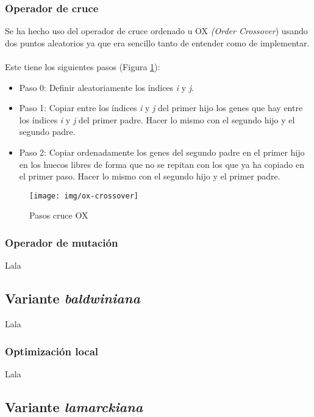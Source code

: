 \label{sec:op-cruce}
\subsubsection{Operador de cruce}

Se ha hecho uso del operador de cruce ordenado u OX \textit{(Order Crossover}) usando dos puntos aleatorios ya que era sencillo tanto de entender como de implementar.
\\ \\
Este tiene los siguientes pasos (Figura \ref{fig:ox-crossover}):
\begin{itemize}
	\item Paso 0: Definir aleatoriamente los índices \textit{i} y \textit{j}.
	\item Paso 1: Copiar entre los índices \textit{i} y \textit{j} del primer hijo los genes que hay entre los índices \textit{i} y \textit{\textit{j}} del primer padre. Hacer lo mismo con el segundo hijo y el segundo padre.
	\item Paso 2: Copiar ordenadamente los genes del segundo padre en el primer hijo en los huecos libres de forma que no se repitan con los que ya ha copiado en el primer paso. Hacer lo mismo con el segundo hijo y el primer padre.
\end{itemize}
\begin{figure}[H]
	\centering
	\texttt{[image: img/ox-crossover]}
	\caption{Pasos cruce OX}
	\label{fig:ox-crossover}
\end{figure}

\subsubsection{Operador de mutación}

Lala

\subsection{Variante \textit{baldwiniana}}

Lala

\subsubsection{Optimización local}

Lala

\subsection{Variante \textit{lamarckiana}}


